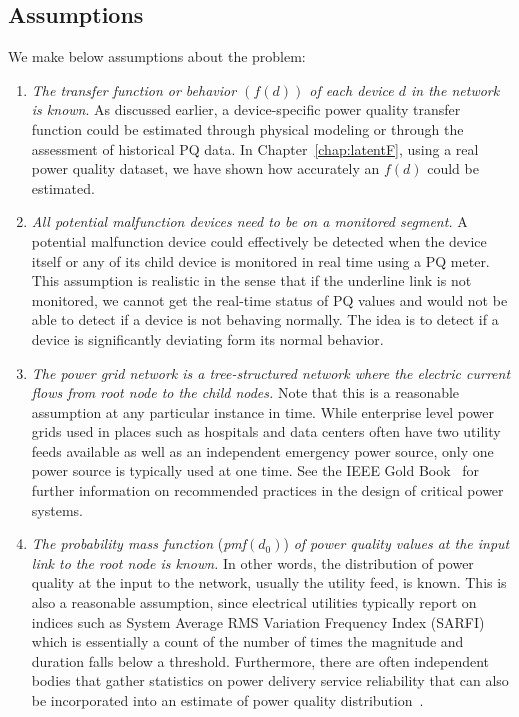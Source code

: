 \documentclass[12pt,oneside]{book}
\begin{document}
\subsection{Assumptions}
We make below assumptions about the problem:
\begin{enumerate}
\item \textit{The transfer function or behavior $\left(f\left(d\right)\right)$ of each device $d$ in the network is known}. As discussed earlier, a device-specific power quality transfer function could be estimated through physical modeling or through the assessment of historical PQ data. In Chapter~\ref{chap:latentF}, using a real power quality dataset, we have shown how accurately an $f(d)$ could be estimated.

\item \textit{All potential malfunction devices need to be on a monitored segment.} A potential malfunction device could effectively be detected when the device itself or any of its child device is monitored in real time using a PQ meter. This assumption is realistic in the sense that if the underline link is not monitored, we cannot get the real-time status of PQ values and would not be able to detect if a device is not behaving normally. The idea is to detect if a device is significantly deviating form its normal behavior.

\item \textit{The power grid network is a tree-structured network where the electric current flows from root node to the child nodes.} Note that this is a reasonable assumption at any particular instance in time. While enterprise level power grids used in places such as hospitals and data centers often have two utility feeds available as well as an independent emergency power source, only one power source is typically used at one time. See the IEEE Gold Book~\cite{goldbook} for further information on recommended practices in the design of critical power systems.

\item \textit{The probability mass function} (\textit{pmf}$\left(d_0\right)$)\textit{ of power quality values at the input link to the root node is known.} In other words, the distribution of power quality at the input to the network, usually the utility feed, is known. This is also a reasonable assumption, since electrical utilities typically report on indices such as System Average RMS Variation Frequency Index (SARFI) which is essentially a count of the number of times the magnitude and duration falls below a threshold. Furthermore, there are often independent bodies that gather statistics on power delivery service reliability that can also be incorporated into an estimate of power quality distribution~\cite{chowdhury2004reliability}.
\end{enumerate}
\end{document}
